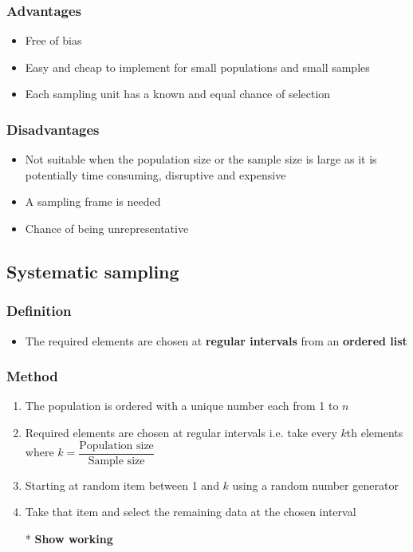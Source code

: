 \subsubsection{Advantages}
\begin{itemize}
    \item Free of bias
    \item Easy and cheap to implement for small populations and small samples
    \item Each sampling unit has a known and equal chance of selection
\end{itemize}
\subsubsection{Disadvantages}
\begin{itemize}
    \item Not suitable when the population size or the sample size is large as it is potentially time consuming, disruptive and expensive
    \item A sampling frame is needed
    \item Chance of being unrepresentative
\end{itemize}
\subsection{Systematic sampling}
\subsubsection{Definition}
\begin{itemize}
    \item The required elements are chosen at \textbf{regular intervals} from an \textbf{ordered list}
\end{itemize}
\subsubsection{Method}
\begin{enumerate}
    \item The population is ordered with a unique number each from 1 to $n$
    \item Required elements are chosen at regular intervals i.e. take every $k$th elements where $k=\dfrac{\text{Population size}}{\text{Sample size}}$
    \item Starting at random item between 1 and $k$ using a random number generator
    \item Take that item and select the remaining data at the chosen interval
    \item[*] \textbf{Show working}
\end{enumerate}
